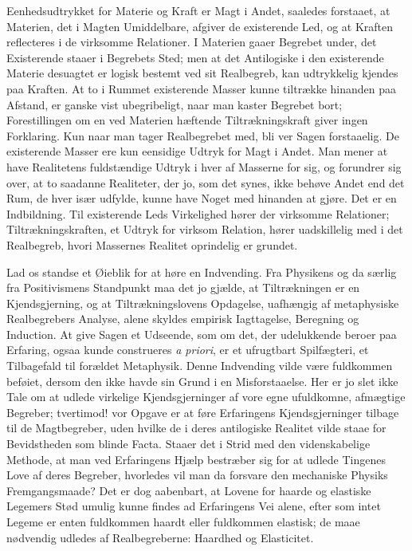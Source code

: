 \documentclass[12pt]{article}
\newcommand{\opage}[1]{\marginnote{\footnotesize\textit{[#1]}}}
\begin{document}
Eenhedsudtrykket for Materie og Kraft er Magt i Andet, saaledes
forstaaet, at Materien, det i Magten Umiddelbare, afgiver de
existerende Led, og at Kraften reflecteres i de virksomme
Relationer. I Materien gaaer Begrebet under, det Existerende staaer
i Begrebets Sted; men at det Antilogiske i den existerende Materie
desuagtet er logisk bestemt ved sit Realbegreb, kan udtrykkelig
kjendes paa Kraften. At to i Rummet existerende Masser kunne
tiltrække hinanden paa Afstand, er ganske vist ubegribeligt, naar
man kaster Begrebet bort; Forestillingen om en ved Materien
hæftende Tiltrækningskraft giver ingen Forklaring. Kun naar man
tager Realbegrebet med, bli%
\opage{41}ver Sagen forstaaelig. De existerende Masser ere kun eensidige
Udtryk for Magt i Andet. Man mener at have Realitetens fuldstændige
Udtryk i hver af Masserne for sig, og forundrer sig over, at to
saadanne Realiteter, der jo, som det synes, ikke behøve Andet end
det Rum, de hver især udfylde, kunne have Noget med hinanden at
gjøre. Det er en Indbildning. Til existerende Leds Virkelighed
hører der virksomme Relationer; Tiltrækningskraften, et Udtryk for
virksom Relation, hører uadskillelig med i det Realbegreb, hvori
Massernes Realitet oprindelig er grundet.

Lad os standse et Øieblik for at høre en Indvending. Fra Physikens
og da særlig fra Positivismens Standpunkt maa det jo gjælde, at
Tiltrækningen er en Kjendsgjerning, og at Tiltrækningslovens
Opdagelse, uafhængig af metaphysiske Realbegrebers Analyse, alene
skyldes empirisk Iagttagelse, Beregning og Induction. At give Sagen
et Udseende, som om det, der udelukkende beroer paa Erfaring, ogsaa
kunde construeres \textit{a priori}, er et ufrugtbart Spilfægteri,
et Tilbagefald til forældet Metaphysik. Denne Indvending vilde være
fuldkommen beføiet, dersom den ikke havde sin Grund i en
Misforstaaelse. Her er jo slet ikke Tale om at udlede virkelige
Kjendsgjerninger af vore egne ufuldkomne, afmægtige Begreber;
tvertimod! vor Opgave er at føre Erfaringens Kjendsgjerninger
tilbage til de Magtbegreber, uden hvilke de i deres antilogiske
Realitet vilde staae for Bevidstheden som blinde Facta. Staaer det
i Strid med den videnskabelige Methode, at man ved Erfaringens
Hjælp bestræber sig for at udlede Tingenes Love af deres Begreber,
hvorledes vil man da forsvare den mechaniske Physiks Fremgangsmaade?
Det er dog aabenbart, at Lovene for haarde og elastiske Legemers
Stød umulig kunne findes ad Erfaringens Vei alene, efter som intet
Legeme er enten fuldkommen haardt eller fuldkommen elastisk; de
maae nødvendig udledes af Realbegreberne: Haardhed og Elasticitet.
\end{document}

